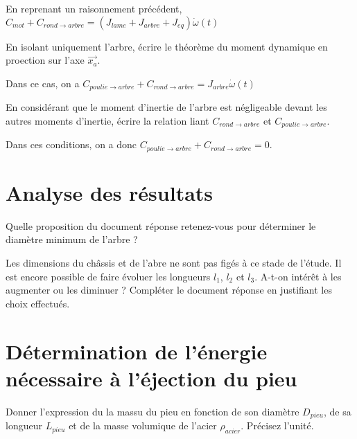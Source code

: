 \documentclass[11pt]{article}
\begin{document}
\begin{UPSTIcorrige}
En reprenant un raisonnement précédent, 
$  C_{mot}+C_{rond\rightarrow arbre} = \left(J_{lame}+J_{arbre}+J_{eq}\right) \dot{\omega}(t)$
\end{UPSTIcorrige}

\UPSTIquestion En isolant uniquement l'arbre, écrire le théorème du moment dynamique en proection sur l'axe $\overrightarrow{x_a}$.
\begin{UPSTIcorrige}
Dans ce cas, on a 
$  C_{poulie \rightarrow arbre}+C_{rond\rightarrow arbre} = J_{arbre} \dot{\omega}(t)$
\end{UPSTIcorrige}

\UPSTIquestion En considérant que le moment d'inertie de l'arbre est négligeable devant les autres moments d'inertie, écrire la relation liant $C_{rond\rightarrow arbre}$ et $C_{poulie\rightarrow arbre}$.

\begin{UPSTIcorrige}
Dans ces conditions, on a donc $  C_{poulie \rightarrow arbre}+C_{rond\rightarrow arbre} =0$.
\end{UPSTIcorrige}

\section{Analyse des résultats}

\UPSTIquestion* Quelle proposition du document réponse retenez-vous pour déterminer le diamètre minimum de l'arbre ?
\begin{UPSTIcorrige}
\end{UPSTIcorrige}

\UPSTIquestion Les dimensions du châssis et de l'abre ne sont pas figés à ce stade de l'étude. Il est encore possible de faire évoluer les longueurs $l_1$, $l_2$ et $l_3$. A-t-on intérêt à les augmenter ou les diminuer ? Compléter le document réponse en justifiant les choix effectués. 
\begin{UPSTIcorrige}
\end{UPSTIcorrige}


\section{Détermination de l'énergie nécessaire à l'éjection du pieu}

\UPSTIquestion* Donner l'expression du la massu du pieu en fonction de son diamètre $D_{pieu}$, de sa longueur $L_{pieu}$ et de la masse volumique de l'acier $\rho_{acier}$. Précisez l'unité. 
\begin{UPSTIcorrige}
\end{UPSTIcorrige}
\end{document}
